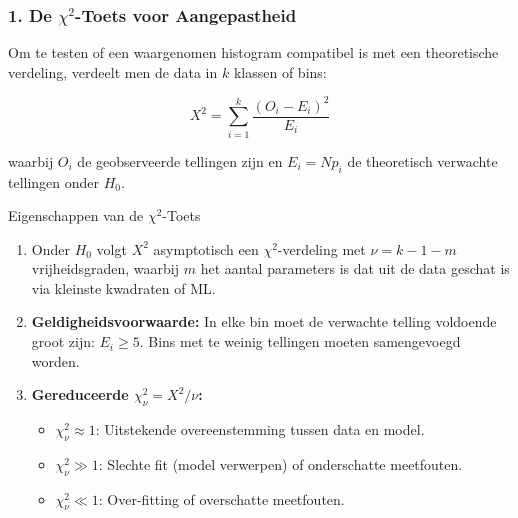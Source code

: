 \documentclass[11pt,a4paper]{article}
\begin{document}
\subsubsection{1. De \texorpdfstring{$\chi^2$}{Chi-kwadraat}-Toets voor Aangepastheid}
Om te testen of een waargenomen histogram compatibel is met een theoretische verdeling, verdeelt men de data in $k$ klassen of bins:
\begin{formulabox}
\begin{equation}
    X^2 = \sum_{i=1}^k \frac{(O_i - E_i)^2}{E_i}
\end{equation}
\end{formulabox}
waarbij $O_i$ de geobserveerde tellingen zijn en $E_i = N p_i$ de theoretisch verwachte tellingen onder $H_0$.

\begin{theobox}{Eigenschappen van de $\chi^2$-Toets}
\begin{enumerate}[leftmargin=1.2em]
    \item Onder $H_0$ volgt $X^2$ asymptotisch een $\chi^2$-verdeling met $\nu = k - 1 - m$ vrijheidsgraden, waarbij $m$ het aantal parameters is dat uit de data geschat is via kleinste kwadraten of ML.
    \item \textbf{Geldigheidsvoorwaarde:} In elke bin moet de verwachte telling voldoende groot zijn: $E_i \ge 5$. Bins met te weinig tellingen moeten samengevoegd worden.
    \item \textbf{Gereduceerde $\chi^2_\nu = X^2 / \nu$:}
    \begin{itemize}
        \item $\chi^2_\nu \approx 1$: Uitstekende overeenstemming tussen data en model.
        \item $\chi^2_\nu \gg 1$: Slechte fit (model verwerpen) of onderschatte meetfouten.
        \item $\chi^2_\nu \ll 1$: Over-fitting of overschatte meetfouten.
    \end{itemize}
\end{enumerate}
\end{theobox}
\end{document}
